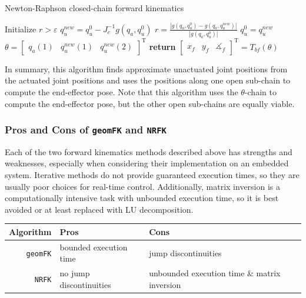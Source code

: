 \documentclass{report}
\begin{document}
\begin{algorithm}
	\caption{Newton-Raphson closed-chain forward kinematics}\label{NRFKalg}
	\begin{algorithmic}
		\State Initialize $r > \varepsilon$ 
		\State $q_{u}^{new} = q_{u}^{0} - J_{c}^{-1}g\left(q_{a},q_{u}^{0}\right)$
		\State $r = \frac{\left| g(q_{a},q_{u}^{0}) - g(q_{a},q_{u}^{new})\right|}{\left| g(q_{a},q_{u}^{0})\right|} $ 
		\State $q_{u}^{0} = q_{u}^{new}$
		\EndWhile {}
		\State $\theta = \begin{bmatrix} q_{a}(1) & q_{u}^{new}(1) & q_{u}^{new}(2)\end{bmatrix}^{\text{T}}$
		\State \textbf{return} $\begin{bmatrix} x_{f} & y_{f} & \measuredangle_{f}\end{bmatrix}^{\text{T}} = T_{bf}(\theta)$ 
		\EndFunction
	\end{algorithmic}
\end{algorithm}

In summary, this algorithm finds approximate unactuated joint positions from the actuated joint positions and uses the positions along one open sub-chain to compute the end-effector pose. Note that this algorithm uses the $\theta$-chain to compute the end-effector pose, but the other open sub-chains are equally viable.

\subsubsection[Pros and Cons of \texttt{geomFK} and \texttt{NRFK}]{Pros and Cons of \texttt{geomFK} and \texttt{NRFK}}\label{sec:prosconsFK}

Each of the two forward kinematics methods described above has strengths and weaknesses, especially when considering their implementation on an embedded system. Iterative methods do not provide guaranteed execution times, so they are usually poor choices for real-time control. Additionally, matrix inversion is a computationally intensive task with unbounded execution time, so it is best avoided or at least replaced with LU decomposition.

\begin{center}
  \begin{tabular}{ r | l l }
  	Algorithm & Pros & Cons \\ \hline
    \texttt{geomFK} & bounded execution time  & jump discontinuities \\
    \texttt{NRFK} & no jump discontinuities & unbounded execution time \& matrix inversion
  \end{tabular}
\end{center}
\end{document}
